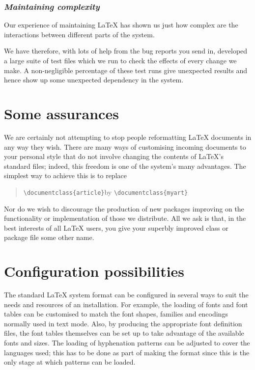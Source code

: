 \documentclass{ltxguide}[1995/11/28]
\newcommand{\reasonsection}[1]{\subsubsection*{\it #1}}
\begin{document}
\reasonsection{Maintaining complexity}
\label{sec:compl}

Our experience of maintaining \LaTeX{} has shown us just how complex
are the interactions between different parts of the system.

We have therefore, with lots of help from the bug reports you send in,
developed a large suite of test files which we run to check the
effects of every change we make.  A non-negligible percentage of these
test runs give unexpected results and hence show up some unexpected
dependency in the system.


\section{Some assurances}
\label{sec:conc}

We are certainly not attempting to stop people reformatting \LaTeX{}
documents in any way they wish.  There are many ways of customising
incoming documents to your personal style that do not involve changing
the contents of \LaTeX{}'s standard files; indeed, this freedom is one
of the system's many advantages.
The simplest way to achieve this is to replace
\begin{quote}
\verb|\documentclass{article}|\quad by\quad
\verb|\documentclass{myart}|
\end{quote}

Nor do we wish to discourage the production of new packages improving
on the functionality or implementation of those we distribute.  All we
ask is that, in the best interests of all \LaTeX{} users, you give
your superbly improved class or package file some other name.

\section{Configuration possibilities}
\label{sec:conposs}

The standard \LaTeX{} system format can be configured in several ways
to suit the needs and resources of an installation.  For example, the
loading of fonts and font tables can be customised to match the font
shapes, families and encodings normally used in text mode.  Also, by
producing the appropriate font definition files, the font tables
themselves can be set up to take advantage of the available fonts and
sizes.  The loading of hyphenation patterns can be adjusted to cover
the languages used; this has to be done as part of making the format
since this is the only stage at which patterns can be loaded.
\end{document}
